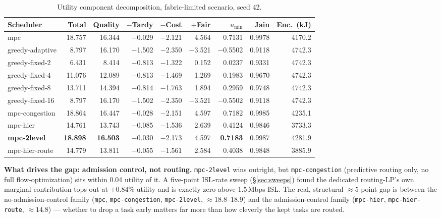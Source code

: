 \begin{table}[h]
\centering
\caption{Utility component decomposition, fabric-limited scenario, seed 42.}
\label{tab:utility-components}
\begin{tabular}{lrrrrrrrr}
\toprule
Scheduler & Total & Quality & $-$Tardy & $-$Cost & $+$Fair & $u_{\min}$ & Jain & Enc.\ (kJ) \\
\midrule
mpc              & 18.757 & 16.344 & $-$0.029 & $-$2.121 & 4.564  & 0.7131  & 0.9978 & 4170.2 \\
greedy-adaptive  & 8.797  & 16.170 & $-$1.502 & $-$2.350 & $-$3.521 & $-$0.5502 & 0.9118 & 4742.3 \\
greedy-fixed-2   & 6.431  & 8.414  & $-$0.813 & $-$1.322 & 0.152  & 0.0237  & 0.9331 & 4742.3 \\
greedy-fixed-4   & 11.076 & 12.089 & $-$0.813 & $-$1.469 & 1.269  & 0.1983  & 0.9670 & 4742.3 \\
greedy-fixed-8   & 13.711 & 14.394 & $-$0.814 & $-$1.763 & 1.894  & 0.2959  & 0.9748 & 4742.3 \\
greedy-fixed-16  & 8.797  & 16.170 & $-$1.502 & $-$2.350 & $-$3.521 & $-$0.5502 & 0.9118 & 4742.3 \\
mpc-congestion   & 18.864 & 16.447 & $-$0.028 & $-$2.151 & 4.597  & 0.7182  & 0.9985 & 4235.1 \\
mpc-hier         & 14.761 & 13.743 & $-$0.085 & $-$1.536 & 2.639  & 0.4124  & 0.9846 & 3733.3 \\
\textbf{mpc-2level} & \textbf{18.898} & \textbf{16.503} & $-$0.030 & $-$2.173 & 4.597 & \textbf{0.7183} & 0.9987 & 4281.9 \\
mpc-hier-route   & 14.779 & 13.811 & $-$0.055 & $-$1.561 & 2.584  & 0.4038  & 0.9848 & 3885.9 \\
\bottomrule
\end{tabular}
\end{table}

\textbf{What drives the gap: admission control, not routing.}
\texttt{mpc-2level} wins outright, but \texttt{mpc-congestion} (predictive
routing only, no full flow-optimization) sits within 0.04 utility of it. A
five-point ISL-rate sweep (\S\ref{sec:sweeps}) found the dedicated
routing-LP's own marginal contribution tops out at $+0.84\%$ utility and is
exactly zero above 1.5\,Mbps ISL. The real, structural $\approx 5$-point gap
is between the no-admission-control family (\texttt{mpc},
\texttt{mpc-congestion}, \texttt{mpc-2level}, $\approx 18.8$--$18.9$) and the
admission-control family (\texttt{mpc-hier}, \texttt{mpc-hier-route},
$\approx 14.8$) — whether to drop a task early matters far more than how
cleverly the kept tasks are routed.

